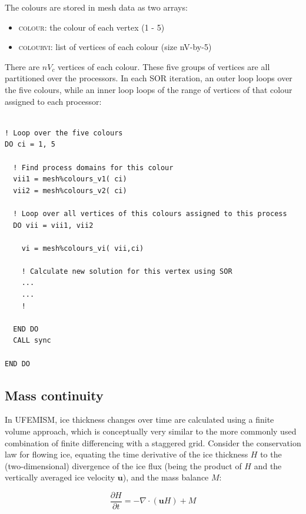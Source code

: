 \documentclass{article}
\begin{document}
The colours are stored in mesh data as two arrays:

\begin{itemize}
\item \textsc{colour}: the colour of each vertex (1 - 5)
\item \textsc{colour\textunderscore vi}: list of vertices of each colour (size nV-by-5)
\end{itemize}

There are $nV_c$ vertices of each colour. These five groups of vertices are all partitioned over the processors. In each SOR iteration, an outer loop loops over the five colours, while an inner loop loops of the range of vertices of that colour assigned to each processor:

\begin{lstlisting}

! Loop over the five colours
DO ci = 1, 5

  ! Find process domains for this colour
  vii1 = mesh%colours_v1( ci)
  vii2 = mesh%colours_v2( ci)
  
  ! Loop over all vertices of this colours assigned to this process
  DO vii = vii1, vii2
    
    vi = mesh%colours_vi( vii,ci)
    
    ! Calculate new solution for this vertex using SOR
    ...
    ...
    !
    
  END DO
  CALL sync
  
END DO

\end{lstlisting}

\subsection{Mass continuity}

In UFEMISM, ice thickness changes over time are calculated using a finite volume approach, which is conceptually very similar to the more commonly used combination of finite differencing with a staggered grid. Consider the conservation law for flowing ice, equating the time derivative of the ice thickness $H$ to the (two-dimensional) divergence of the ice flux (being the product of $H$ and the vertically averaged ice velocity $\textbf{u}$), and the mass balance $M$:

\begin{equation} \label{iceconsvlaw}
\frac{\partial H}{\partial t} = -\nabla \cdot \left( \mathbf{u} H \right) + M
\end{equation}
\end{document}
